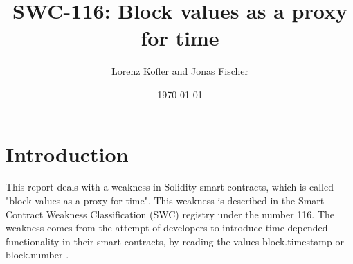 \documentclass{article}
\title{SWC-116: Block values as a proxy for time}
\author{Lorenz Kofler and Jonas Fischer}
\date{\today}
\begin{document}
\maketitle
\tableofcontents
\newpage

\section{Introduction}
This report deals with a weakness in Solidity smart contracts, which is called
"block values as a proxy for time". This weakness is described in the Smart
Contract Weakness Classification (SWC) registry under the number 116. \newline
The weakness comes from the attempt of developers to introduce time depended
functionality in their smart contracts, by reading the values block.timestamp
or block.number \cite{swc116}. \newline



% 







\newpage

\end{document}
